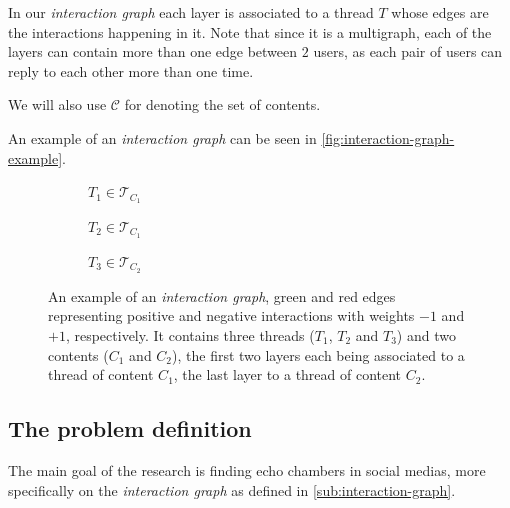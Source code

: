 In our \emph{interaction graph} each layer is associated
to a thread $T$ whose edges are the interactions happening in it.
Note that since it is a multigraph, each of the layers can contain more than one
edge between $2$ users, as each pair of users can reply to each other more than
one time.

We will also use $\mathcal{C} $ for denoting the set of contents.

An example of an \emph{interaction graph} can be seen in
\autoref{fig:interaction-graph-example}.

\begin{figure}
	\begin{center}
		\begin{subfigure}[b]{0.3\textwidth}
			\centering
			\caption{$T_{1} \in \mathcal{T}_{C_{1}} $}
			\label{fig:tex/tikz/graph_thread1.tikz}
		\end{subfigure}
		\begin{subfigure}[b]{0.3\textwidth}
			\centering
			\caption{$T_{2} \in \mathcal{T}_{C_{1}} $}
			\label{fig:tex/tikz/graph_thread2.tikz}
		\end{subfigure}
		\begin{subfigure}[b]{0.3\textwidth}
			\centering
			\caption{$T_{3} \in \mathcal{T}_{C_{2}} $}
			\label{fig:tex/tikz/graph_thread3.tikz}
		\end{subfigure}
	\end{center}
	\caption[Example of an \emph{interaction graph}]{An example of an \emph{interaction graph}, green and red edges
		representing positive and negative interactions with weights $-1$ and
		$+1$, respectively. It
		contains three threads ($T_1$, $T_2$ and $T_3$) and two contents ($C_1$
		and $C_2$), the first two layers each being
		associated to a thread of content $C_{1} $, the last layer to a thread
		of content $C_{2} $.}
	\label{fig:interaction-graph-example}
\end{figure}

\subsection{The problem definition}%
\label{sub:the_problem_definition}

The main goal of the research is finding echo chambers in social medias, more
specifically on the \emph{interaction graph} as defined in
\autoref{sub:interaction-graph}.

